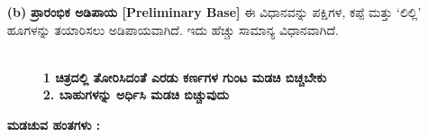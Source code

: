 \begin{enumerate}
\item[{\bf (b)}] \textbf{ಪ್ರಾರಂಭಿಕ ಅಡಿಪಾಯ [Preliminary Base]}
ಈ ವಿಧಾನವನ್ನು ಪಕ್ಷಿಗಳ, ಕಪ್ಪೆ  ಮತ್ತು `ಲಿಲ್ಲಿ' ಹೂಗಳನ್ನು ತಯಾರಿಸಲು ಅಡಿಪಾಯವಾಗಿದೆ. ಇದು ಹೆಚ್ಚು \hbox{ಸಾಮಾನ್ಯ} ವಿಧಾನವಾಗಿದೆ. 
\begin{figure}[H]
\\
\textbf{1 ಚಿತ್ರದಲ್ಲಿ ತೋರಿಸಿದಂತೆ ಎರಡು ಕರ್ಣಗಳ ಗುಂಟ ಮಡಚಿ ಬಿಚ್ಚಬೇಕು}\\
\textbf{2. ಬಾಹುಗಳನ್ನು ಅರ್ಧಿಸಿ ಮಡಚಿ ಬಿಚ್ಚುವುದು}
\end{figure}


\noindent
\textbf{ಮಡಚುವ ಹಂತಗಳು :}
\begin{figure}[H]
\end{figure}
\begin{figure}[H]
\end{figure}


\end{enumerate}
